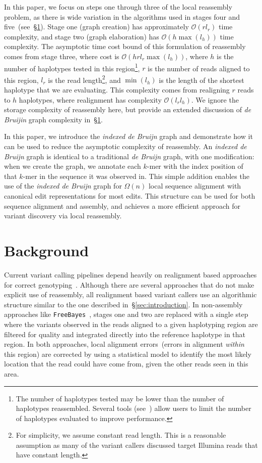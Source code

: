 \documentclass[11pt]{article}
\begin{document}
In this paper, we focus on steps one through three of the local reassembly problem, as there is wide
variation in the algorithms used in stages four and five~(see~\S\ref{sec:background}). Stage one (graph
creation) has approximately $\mathcal{O}(r l_r)$ time complexity, and stage two (graph elaboration) has
$\mathcal{O}(h \max(l_h))$ time complexity.
The asymptotic time cost bound of this formulation of reassembly comes from stage three, where cost is $\mathcal{O}(h r l_r
\max(l_h))$, where $h$ is the number of haplotypes tested in this region\footnote{The number of
haplotypes tested may be lower than the number of haplotypes reassembled. Several tools
(see~\cite{depristo11,garrison12}) allow users to limit the number of haplotypes evaluated to improve
performance.}, $r$ is the number of reads aligned to this region, $l_r$ is the read length\footnote{For
simplicity, we assume constant read length. This is a reasonable assumption as many of the variant
callers discussed target Illumina reads that have constant length.}, and $\min(l_h)$ is the length of the
shortest haplotype that we are evaluating. This complexity comes from realigning $r$ reads to $h$
haplotypes, where realignment has complexity $\mathcal{O}(l_r l_h)$. We ignore the storage complexity of
reassembly here, but provide an extended
discussion of \emph{de Bruijin} graph complexity in~\S\ref{sec:background}.

In this paper, we introduce the \emph{indexed de Bruijn} graph and demonstrate how it can be used to
reduce the asymptotic complexity of reassembly. An \emph{indexed de Bruijn} graph is identical to a
traditional \emph{de Bruijn} graph, with one modification: when we create the graph, we annotate each
$k$-mer with the index position of that $k$-mer in the sequence it was observed in. This simple addition
enables the use of the \emph{indexed de Bruijn} graph for $\Omega(n)$ local sequence alignment with
canonical edit representations for most edits. This structure can be used for both sequence alignment and
assembly, and achieves a more efficient approach for variant discovery via local reassembly.

\section{Background}
\label{sec:background}

Current variant calling pipelines depend heavily on realignment based approaches for correct
genotyping~\cite{li14}. Although there are several approaches that do not make explicit use of reassembly,
all realignment based variant callers use an algorithmic structure similar to the one described
in~\S\ref{sec:introduction}. In non-assembly approaches like \texttt{FreeBayes}~\cite{garrison12}, stages
one and two are replaced with a single step where the variants observed in the reads aligned to a given
haplotyping region are filtered for quality and integrated directly into the reference haplotype in that region.
In both approaches, local alignment errors~(errors in alignment \emph{within} this region) are corrected
by using a statistical model to identify the most likely location that the read could have come from, given
the other reads seen in this area.
\end{document}
